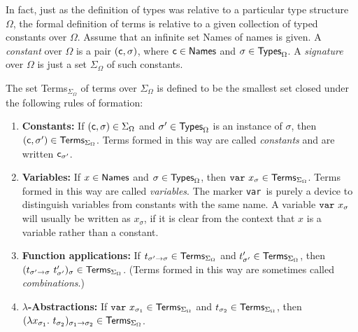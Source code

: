 In fact, just as the definition of types was relative to a particular
type structure $\Omega$, the formal definition of terms is relative to
a given collection of typed constants over $\Omega$.  Assume that an
infinite set {\sf Names} of names is given. A {\em constant\/} over
$\Omega$ is a pair $(\mbox{\normalsize\sf c}, \sigma)$, where $\mbox{\normalsize\sf c}\in{\sf Names}$
and $\sigma\in{\sf Types}_{\Omega}$. A {\em signature} over $\Omega$
is just a set $\Sigma_\Omega$ of such constants.

The set {\sf Terms}$_{\Sigma_{\Omega}}$ of terms over
$\Sigma_{\Omega}$ is defined to be the smallest set closed under the
following rules of formation:
\begin{enumerate}

\item {\bf Constants:} If $(\mbox{\normalsize\sf c},\sigma)\in{\Sigma_{\Omega}}$ and
$\sigma'\in{\sf Types}_{\Omega}$
is an instance of $\sigma$, then $(\mbox{\normalsize\sf c},{\sigma'})\in{\sf
Terms}_{\Sigma_{\Omega}}$.  Terms formed in this way are called {\it
constants\/} and are written $\mbox{\normalsize\sf c}_{\sigma'}$.

\item {\bf Variables:}  If  $x\in{\sf  Names}$  and  $\sigma\in{\sf
Types}_{\Omega}$, then ${\tt var}\ x_{\sigma}\in{\sf
Terms}_{\Sigma_{\Omega}}$. Terms formed in this way are called {\it
variables}.  The marker {\tt var}\ is purely a device to
distinguish variables from constants with the same name.  A variable
${\tt var}\ x_{\sigma}$ will usually be written as $x_{\sigma}$, if it
is clear from the context that $x$ is a variable rather than a
constant.

\item {\bf Function applications:}  If $t_{\sigma'{{\to}}\sigma}\in{\sf
Terms}_{\Sigma_{\Omega}}$ and $t'_{\sigma'}\in{\sf
Terms}_{\Sigma_{\Omega}}$, then $(t_{\sigma'{\to}\sigma}\
t'_{\sigma'})_{\sigma}\in {\sf Terms}_{\Sigma_{\Omega}}$.
(Terms formed in this way are sometimes called {\it combinations}.)

\item {\bf $\lambda$-Abstractions:} If ${\tt var}\ x_{\sigma_1}
\in{\sf Terms}_{\Sigma_{\Omega}}$  and $t_{\sigma_2}\in{\sf
Terms}_{\Sigma_{\Omega}}$, then $(\lambda x_{\sigma_1}.\
t_{\sigma_2})_{\sigma_1{\to}\sigma_2}
\in{\sf Terms}_{\Sigma_{\Omega}}$.

\end{enumerate}


